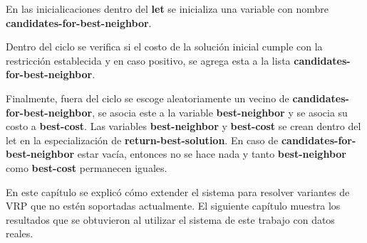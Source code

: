 En las inicialicaciones dentro del \textbf{let} se inicializa una variable con nombre \textbf{candidates-for-best-neighbor}.

Dentro del ciclo se verifica si el costo de la solución inicial cumple con la restricción establecida y en caso positivo, se agrega esta a la lista \textbf{candidates-for-best-neighbor}.

Finalmente, fuera del ciclo se escoge aleatoriamente un vecino de \textbf{candidates-for-best-neighbor}, se asocia este a la variable \textbf{best-neighbor} y se asocia su costo a \textbf{best-cost}. Las variables \textbf{best-neighbor} y \textbf{best-cost} se crean dentro del let en la especialización de \textbf{return-best-solution}. En caso de \textbf{candidates-for-best-neighbor} estar vacía, entonces no se hace nada y tanto \textbf{best-neighbor} como \textbf{best-cost} permanecen iguales.

En este capítulo se explicó cómo extender el sistema para resolver variantes de VRP que no estén soportadas actualmente. El siguiente capítulo muestra los resultados que se obtuvieron al utilizar el sistema de este trabajo con datos reales.


